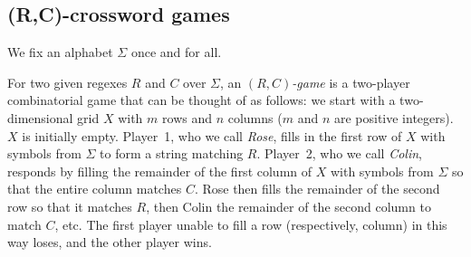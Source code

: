 \documentclass{article}
\newcommand{\0}{\mathbf{0}}
\newcommand{\1}{\mathbf{1}}
\newcommand{\2}{\mathbf{2}}
\newcommand{\tup}[1]{\langle{} #1 \rangle{}}
\theoremstyle{plain}
\theoremstyle{definition}
\newtheorem{definition}{Definition}
\newcounter{row}
\newcounter{col}
\begin{document}
\subsection{(R,C)-crossword games}

We fix an alphabet $\Sigma$ once and for all.

For two given regexes $R$ and $C$ over $\Sigma$, an \emph{$(R,C)$-game} is a two-player combinatorial game that can be thought of as follows: we start with a two-dimensional grid $X$ with $m$ rows and $n$ columns ($m$ and $n$ are positive integers).  $X$ is initially empty.  Player~1, who we call \emph{Rose}, fills in the first row of $X$ with symbols from $\Sigma$ to form a string matching $R$.
Player~2, who we call \emph{Colin}, responds by filling the remainder of the first column of $X$ with symbols from $\Sigma$ so that the entire column matches $C$.  Rose then fills the remainder of the second row so that it matches $R$, then Colin the remainder of the second column to match $C$, etc.  The first player unable to fill a row (respectively, column) in this way loses, and the other player wins.

\end{document}
